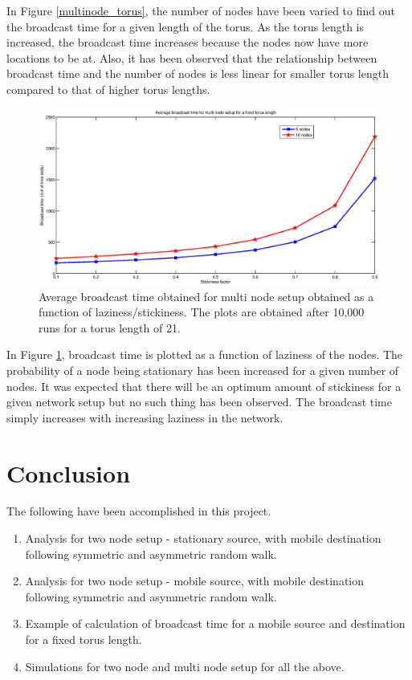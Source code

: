 \documentclass[a4paper,10pt,english]{article}
\begin{document}
In Figure \ref{multinode_torus}, the number of nodes have been varied to find out the broadcast time for a given length of the torus. As the torus length is increased, the broadcast time increases because the nodes now have more locations to be at. Also, it has been observed that the relationship between broadcast time and the number of nodes is less linear for smaller torus length compared to that of higher torus lengths.

\begin{figure}[!h]
	\begin{center}
		\includegraphics[scale = 0.5]{sticky_comp.eps}
		\caption{Average broadcast time obtained for multi node setup obtained as a function of laziness/stickiness. The plots are obtained after 10,000 runs for a torus length of 21.}
		\label{stickiness}
	\end{center}
\end{figure}

In Figure \ref{stickiness}, broadcast time is plotted as a function of laziness of the nodes. The probability of a node being stationary has been increased for a given number of nodes. It was expected that there will be an optimum amount of stickiness for a given network setup but no such thing has been observed. The broadcast time simply increases with increasing laziness in the network.  
\FloatBarrier


\section{Conclusion}\label{concl}
The following have been accomplished in this project.
\begin{enumerate}
	\item Analysis for two node setup - stationary source, with mobile destination following symmetric and asymmetric random walk.
	\item Analysis for two node setup - mobile source, with mobile destination following symmetric and asymmetric random walk.
	\item Example of calculation of broadcast time for a mobile source and destination for a fixed torus length.
	\item Simulations for two node and multi node setup for all the above.
\end{enumerate}
\end{document}
